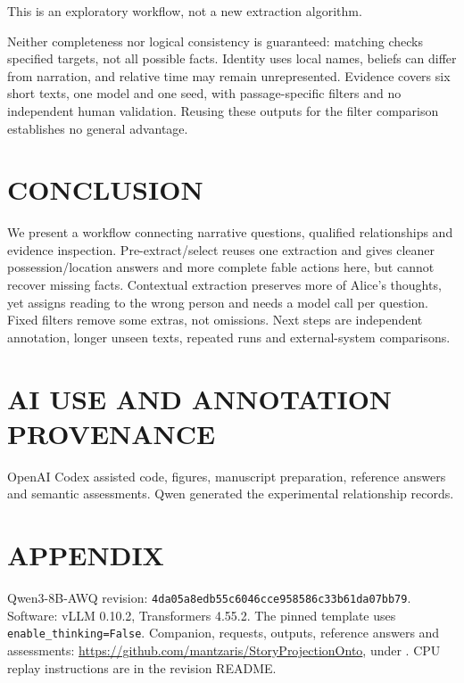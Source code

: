 \documentclass[a4paper,twoside]{article}
\begin{document}
\noindent This is an exploratory workflow, not a new extraction algorithm.

Neither completeness nor logical consistency is guaranteed: matching checks specified targets, not all possible facts. Identity uses local names, beliefs can differ from narration, and relative time may remain unrepresented. Evidence covers six short texts, one model and one seed, with passage-specific filters and no independent human validation. Reusing these outputs for the filter comparison establishes no general advantage.

\section{\uppercase{Conclusion}}
\noindent We present a workflow connecting narrative questions, qualified relationships and evidence inspection. Pre-extract/select reuses one extraction and gives cleaner possession/location answers and more complete fable actions here, but cannot recover missing facts. Contextual extraction preserves more of Alice's thoughts, yet assigns reading to the wrong person and needs a model call per question. Fixed filters remove some extras, not omissions. Next steps are independent annotation, longer unseen texts, repeated runs and external-system comparisons.

\section{\uppercase{AI Use and Annotation Provenance}}
\label{sec:disclosure}
\noindent OpenAI Codex \cite{openai2025} assisted code, figures, manuscript preparation, reference answers and semantic assessments. Qwen generated the experimental relationship records.


{\small}
\section*{APPENDIX}
\noindent Qwen3-8B-AWQ revision: \texttt{4da05a8edb55c6046cce9585}\allowbreak\texttt{86c33b61da07bb79}. Software: vLLM 0.10.2, Transformers 4.55.2. The pinned template uses \texttt{enable\_thinking=False}. Companion, requests, outputs, reference answers and assessments: \url{https://github.com/mantzaris/StoryProjectionOnto}, under . CPU replay instructions are in the revision README.
\end{document}
